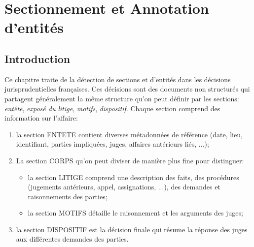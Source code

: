 \chapter{Sectionnement et Annotation d'entités}
\label{chap:structuration}


\section{Introduction}
\label{sec:structuration:motivation}
Ce chapitre traite de la détection de sections et d'entités dans les décisions jurisprudentielles françaises. Ces décisions sont des documents non structurés qui partagent généralement la même structure qu'on peut définir par les sections: \textit{entête}, \textit{exposé du litige}, \textit{motifs}, \textit{dispositif}. Chaque section comprend des information sur l'affaire: 
\begin{enumerate}
\item la section ENTETE contient diverses métadonnées de référence (date, lieu, identifiant, parties impliquées, juges, affaires antérieurs liés, ...); 
\item La section CORPS qu'on peut diviser de manière plus fine pour distinguer:
\begin{itemize}
\item la section LITIGE comprend une description des faits, des procédures (jugements antérieurs, appel, assignations, ...), des demandes et raisonnements des parties; 
\item la section MOTIFS détaille le raisonnement et les arguments des juges;
\end{itemize}
\item la section DISPOSITIF est la décision finale qui résume la réponse des juges aux différentes demandes des parties.
\end{enumerate}

